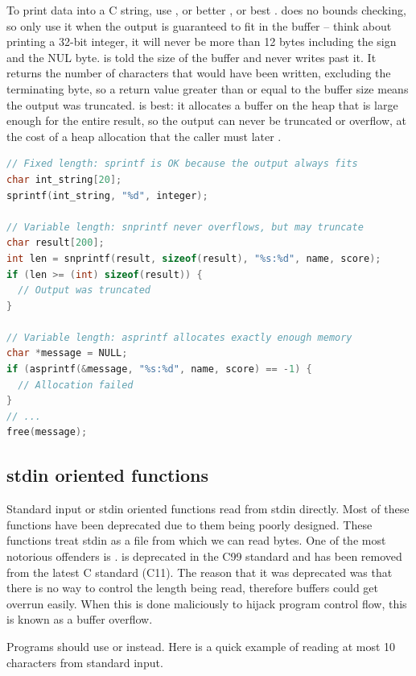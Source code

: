 To print data into a C string, use , or better , or best .
 does no bounds checking, so only use it when the output is guaranteed to fit in the buffer -- think about printing a 32-bit integer, it will never be more than 12 bytes including the sign and the NUL byte.
 is told the size of the buffer and never writes past it.
It returns the number of characters that would have been written, excluding the terminating byte, so a return value greater than or equal to the buffer size means the output was truncated.
 is best: it allocates a buffer on the heap that is large enough for the entire result, so the output can never be truncated or overflow, at the cost of a heap allocation that the caller must later .

\begin{lstlisting}[language=C]
// Fixed length: sprintf is OK because the output always fits
char int_string[20];
sprintf(int_string, "%d", integer);

// Variable length: snprintf never overflows, but may truncate
char result[200];
int len = snprintf(result, sizeof(result), "%s:%d", name, score);
if (len >= (int) sizeof(result)) {
  // Output was truncated
}

// Variable length: asprintf allocates exactly enough memory
char *message = NULL;
if (asprintf(&message, "%s:%d", name, score) == -1) {
  // Allocation failed
}
// ...
free(message);
\end{lstlisting}

\subsection{stdin oriented functions}

Standard input or stdin oriented functions read from stdin directly.
Most of these functions have been deprecated due to them being poorly designed. These functions treat stdin as a file from which we can read bytes.
One of the most notorious offenders is .
 is deprecated in the C99 standard and has been removed from the latest C standard (C11).
The reason that it was deprecated was that there is no way to control the length being read, therefore buffers could get overrun easily.
When this is done maliciously to hijack program control flow, this is known as a buffer overflow.

Programs should use  or  instead.
Here is a quick example of reading at most 10 characters from standard input.


